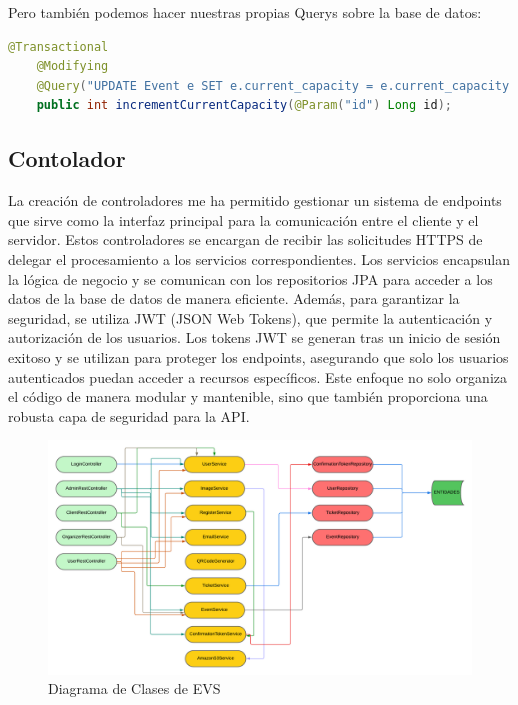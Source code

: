 Pero también podemos hacer nuestras propias Querys sobre la base de datos:
\myjavastyle
\begin{lstlisting}[language=Java, caption=Ejemplo de Query  en Spring Data JPA]
    @Transactional
    @Modifying
    @Query("UPDATE Event e SET e.current_capacity = e.current_capacity + 1 WHERE e.id = :id AND e.current_capacity + 1  <= e.max_capacity")
    public int incrementCurrentCapacity(@Param("id") Long id);
\end{lstlisting}

\subsection{Contolador}
La creación de controladores me ha permitido gestionar un sistema de endpoints que sirve como la interfaz principal 
para la comunicación entre el cliente y el servidor. Estos controladores se encargan de recibir las solicitudes HTTPS de delegar el procesamiento a 
los servicios correspondientes. Los servicios encapsulan la lógica de negocio y se comunican con los repositorios JPA para acceder a los datos de la 
base de datos de manera eficiente. Además, para garantizar la seguridad, se utiliza JWT (JSON Web Tokens), que permite la autenticación y autorización 
de los usuarios. Los tokens JWT se generan tras un inicio de sesión exitoso y se utilizan para proteger los endpoints, asegurando que solo los usuarios 
autenticados puedan acceder a recursos específicos. Este enfoque no solo organiza el código de manera modular y mantenible, sino que también proporciona 
una robusta capa de seguridad para la API.
\begin{figure}[h]
    \centering
    \includegraphics[width=1\textwidth]{DiagramaClases.png} 
    \caption{Diagrama de Clases de EVS}
    \label{fig:class_architecture}
\end{figure}

